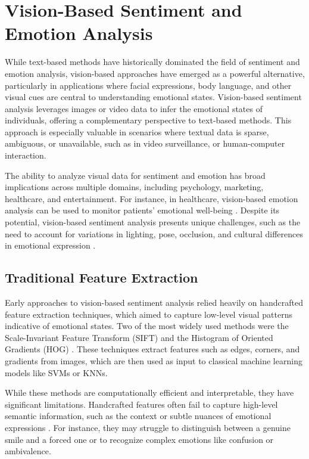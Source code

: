 \section{Vision-Based Sentiment and Emotion Analysis}
\label{sec:vision_analysis}

While text-based methods have historically dominated the field of sentiment and emotion analysis, vision-based approaches have emerged as a powerful alternative, particularly in applications where facial expressions, body language, and other visual cues are central to understanding emotional states. Vision-based sentiment analysis leverages images or video data to infer the emotional states of individuals, offering a complementary perspective to text-based methods. This approach is especially valuable in scenarios where textual data is sparse, ambiguous, or unavailable, such as in video surveillance, or human-computer interaction.
\newline

The ability to analyze visual data for sentiment and emotion has broad implications across multiple domains, including psychology, marketing, healthcare, and entertainment. For instance, in healthcare, vision-based emotion analysis can be used to monitor patients' emotional well-being \cite{6940284}. Despite its potential, vision-based sentiment analysis presents unique challenges, such as the need to account for variations in lighting, pose, occlusion, and cultural differences in emotional expression \cite{10.1145/3240508.3240574}.

\subsection*{Traditional Feature Extraction}

Early approaches to vision-based sentiment analysis relied heavily on handcrafted feature extraction techniques, which aimed to capture low-level visual patterns indicative of emotional states. Two of the most widely used methods were the Scale-Invariant Feature Transform (SIFT) \cite{Lowe2004DistinctiveIF} and the Histogram of Oriented Gradients (HOG) \cite{1467360}. These techniques extract features such as edges, corners, and gradients from images, which are then used as input to classical machine learning models like SVMs or KNNs.
\newline

While these methods are computationally efficient and interpretable, they have significant limitations. Handcrafted features often fail to capture high-level semantic information, such as the context or subtle nuances of emotional expressions \cite{6940284}. For instance, they may struggle to distinguish between a genuine smile and a forced one or to recognize complex emotions like confusion or ambivalence.


